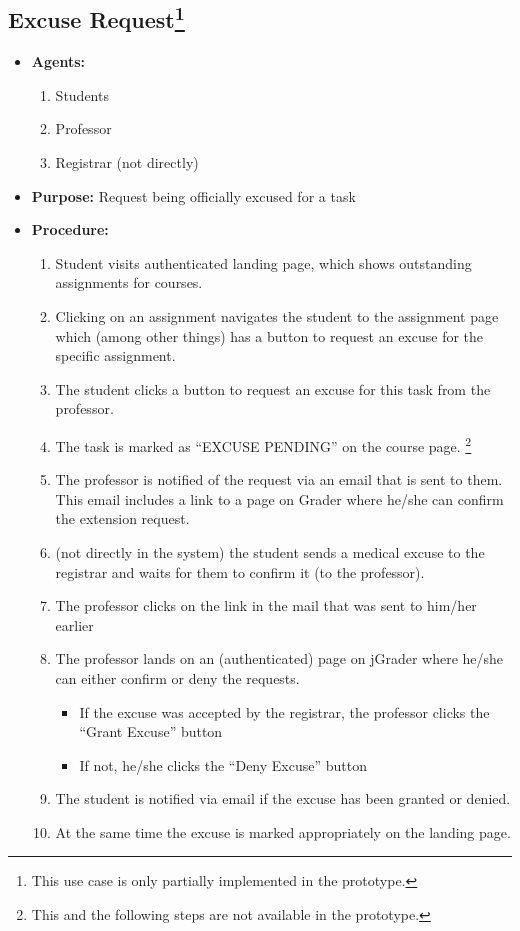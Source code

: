 \subsection{Excuse Request\footnote{This use case is only partially implemented in the prototype. }}

\begin{itemize}
  \item \textbf{Agents:} \begin{enumerate}
    \item Students
    \item Professor
    \item Registrar (not directly)
  \end{enumerate}
  \item \textbf{Purpose:} Request being officially excused for a task
  \item \textbf{Procedure:}
  \begin{enumerate}
    \item Student visits authenticated landing page, which shows outstanding assignments for courses.
    \item Clicking on an assignment navigates the student to the assignment page which (among other things) has a button to request an excuse for the specific assignment.
    \item The student clicks a button to request an excuse for this task from the professor.
    \item The task is marked as “EXCUSE PENDING” on the course page. \footnote{This and the following steps are not available in the prototype. }
    \item The professor is notified of the request via an email that is sent to them. This email includes a link to a page on Grader where he/she can confirm the extension request.
    \item (not directly in the system) the student sends a medical excuse to the registrar and waits for them to confirm it (to the professor).
    \item The professor clicks on the link in the mail that was sent to him/her earlier
    \item The professor lands on an (authenticated) page on jGrader where he/she can either confirm or deny the requests.
    \begin{itemize}
      \item If the excuse was accepted by the registrar, the professor clicks the “Grant Excuse” button
      \item If not, he/she clicks the “Deny Excuse” button
    \end{itemize}
    \item The student is notified via email if the excuse has been granted or denied.
    \item At the same time the excuse is marked appropriately on the landing page.
  \end{enumerate}
\end{itemize}
